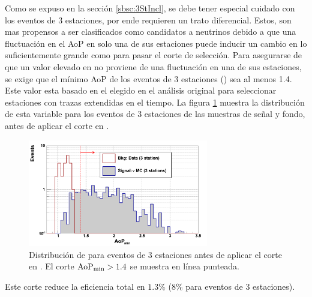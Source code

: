 	Como se expuso en la sección \ref{sbsc:3StIncl}, se debe tener especial cuidado con los eventos de 3 estaciones, por ende requieren un trato diferencial.
	Estos, son mas propensos a ser clasificados como candidatos a neutrinos debido a que una fluctuación en el AoP en solo una de sus estaciones puede inducir un cambio en \aop{} lo suficientemente grande como para pasar el corte de selección.
	Para asegurarse de que un valor elevado en \aop{} no proviene de una fluctuación en una de sus estaciones, se exige que el mínimo AoP de los eventos de 3 estaciones (\aopmin{}) sea al menos 1.4.
	Este valor esta basado en el elegido en el análisis original para seleccionar estaciones con trazas extendidas en el tiempo.
	La figura \ref{fig:minAoP} muestra la distribución de esta variable para los eventos de 3 estaciones de las muestras de señal y fondo, antes de aplicar el corte en \aop{}.
	\begin{figure}[ht]
	\begin{center}
	\includegraphics[width=0.7\textwidth]{fig/seleccionAuger/minAoP_forThesis}
	\caption{Distribución de \aopmin{} para eventos de 3 estaciones antes de aplicar el corte en \aop{}. El corte ${\rm AoP_{min}}>1.4$ se muestra en línea punteada.}
	\label{fig:minAoP}
	\end{center}
	\end{figure}
	Este corte reduce la eficiencia total en $1.3\%$ ($8\%$ para eventos de 3 estaciones).
	

